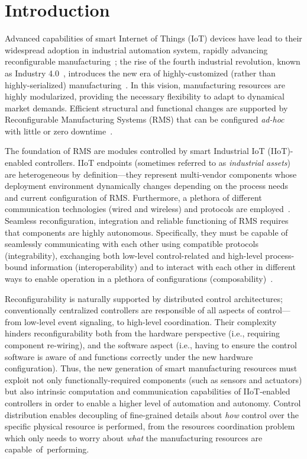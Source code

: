 
\section{Introduction}
\label{sec:intro}


Advanced  capabilities of smart Internet of Things (IoT) devices %
have lead to their  widespread adoption in industrial automation system,
rapidly advancing reconfigurable manufacturing~\cite{jakovljevic_icamm17}; the rise of the fourth industrial revolution, known as Industry 4.0~\cite{I4.0}, introduces the new era of highly-customized (rather than highly-serialized) manufacturing~\cite{Hoda}. In this vision, manufacturing resources are highly modularized, providing the necessary flexibility to adapt to dynamical market demands. Efficient structural and functional changes are supported by Reconfigurable Manufacturing Systems (RMS) that can be configured \emph{ad-hoc} with little or zero downtime~\cite{Koren2018121}.

The foundation of RMS are modules controlled by smart Industrial IoT (IIoT)-enabled controllers. IIoT endpoints (sometimes referred to as \emph{industrial assets}) are heterogeneous by definition---they represent multi-vendor components whose deployment environment dynamically changes depending on the process needs and current configuration of RMS. Furthermore, a plethora of different communication technologies (wired and wireless) and protocols are employed~\cite{Boyes20181}. Seamless reconfiguration, integration and reliable functioning of RMS requires that components are highly autonomous. Specifically, they must be capable of seamlessly communicating with each other using compatible protocols (integrability), exchanging both low-level control-related and high-level process-bound information (interoperability) and to interact with each other in different ways to enable operation in a plethora of configurations (composability)~\cite{IIRA}.

Reconfigurability is naturally supported by distributed control architectures; conventionally centralized controllers are responsible of all aspects of control---from low-level event signaling, to high-level coordination. Their complexity hinders reconfigurability both from the hardware perspective (i.e., requiring component re-wiring), and the software aspect (i.e., having to ensure the control software is aware of and functions correctly under the new hardware configuration). Thus, the new generation of smart manufacturing resources must exploit not only functionally-required components (such as sensors and actuators) but also intrinsic computation and communication capabilities of IIoT-enabled controllers in order to enable a higher level of automation and autonomy. Control distribution enables decoupling of fine-grained details about \emph{how} control over the specific physical resource is performed, from the resources coordination problem which only needs to worry about \emph{what} the manufacturing resources are capable~of~performing.

